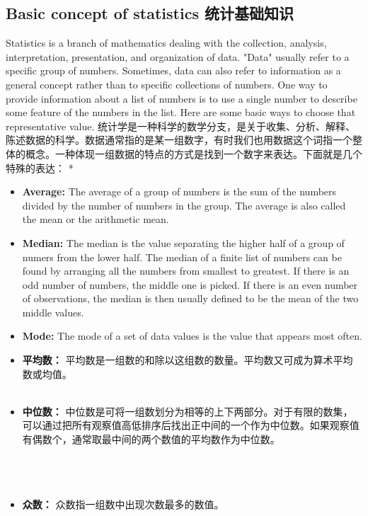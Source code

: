 \subsection{Basic concept of statistics 统计基础知识}
\begin{paracol}{2}
Statistics is a branch of mathematics dealing with the collection, analysis, interpretation, presentation, and organization of data. "Data" usually refer to a specific group of numbers. Sometimes, data can also refer to information as a general concept rather than to specific collections of numbers. One way to provide information about a list of numbers is to use a single number to describe some feature of the numbers in the list. Here are some basic ways to choose that representative value.
\switchcolumn[1]
统计学是一种科学的数学分支，是关于收集、分析、解释、陈述数据的科学。数据通常指的是某一组数字，有时我们也用数据这个词指一个整体的概念。一种体现一组数据的特点的方式是找到一个数字来表达。下面就是几个特殊的表达：
\switchcolumn[0]*
\begin{itemize}
\item {\bf Average: } The average of a group of numbers is the sum of the numbers divided by the number of numbers in the group. The average is also called the mean or the arithmetic mean.
\item {\bf Median: } The median is the value separating the higher half of a group of numers from the lower half. The median of a finite list of numbers can be found by arranging all the numbers from smallest to greatest. If there is an odd number of numbers, the middle one is picked. If there is an even number of observations, the median is then usually defined to be the mean of the two middle values.
\item {\bf Mode: } The mode of a set of data values is the value that appears most often.
\end{itemize}
\switchcolumn[1]
\begin{itemize}
\item {\bf 平均数：} 平均数是一组数的和除以这组数的数量。平均数又可成为算术平均数或均值。\\ \\ 
\item {\bf 中位数：} 中位数是可将一组数划分为相等的上下两部分。对于有限的数集，可以通过把所有观察值高低排序后找出正中间的一个作为中位数。如果观察值有偶数个，通常取最中间的两个数值的平均数作为中位数。\\ \\ \\ \\ 
\item {\bf 众数：} 众数指一组数中出现次数最多的数值。
\end{itemize}
\end{paracol}


